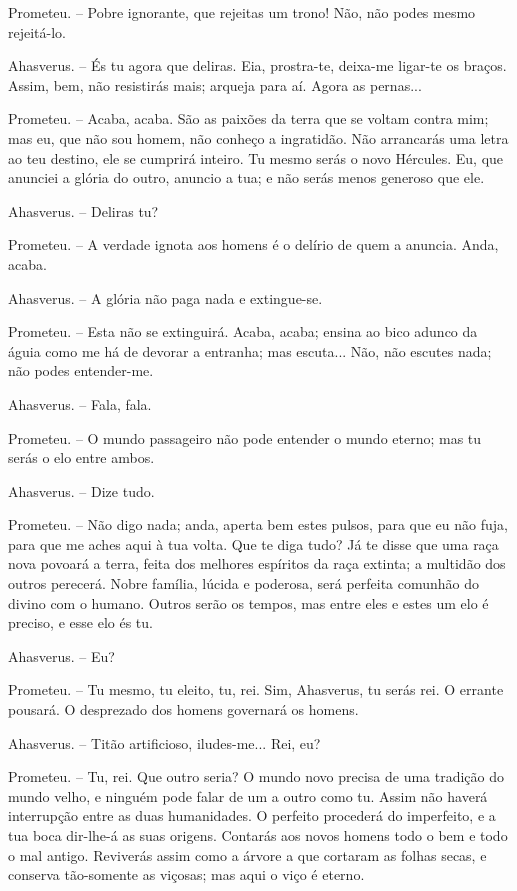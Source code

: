 Prometeu. -- Pobre ignorante, que rejeitas um trono! Não, não podes
mesmo rejeitá-lo.

Ahasverus. -- És tu agora que deliras. Eia, prostra-te, deixa-me
ligar-te os braços. Assim, bem, não resistirás mais; arqueja para aí.
Agora as pernas...

Prometeu. -- Acaba, acaba. São as paixões da terra que se voltam contra
mim; mas eu, que não sou homem, não conheço a ingratidão. Não arrancarás
uma letra ao teu destino, ele se cumprirá inteiro. Tu mesmo serás o novo
Hércules. Eu, que anunciei a glória do outro, anuncio a tua; e não serás
menos generoso que ele.

Ahasverus. -- Deliras tu?

Prometeu. -- A verdade ignota aos homens é o delírio de quem a anuncia.
Anda, acaba.

Ahasverus. -- A glória não paga nada e extingue-se.

Prometeu. -- Esta não se extinguirá. Acaba, acaba; ensina ao bico adunco
da águia como me há de devorar a entranha; mas escuta... Não, não
escutes nada; não podes entender-me.

Ahasverus. -- Fala, fala.

Prometeu. -- O mundo passageiro não pode entender o mundo eterno; mas tu
serás o elo entre ambos.

Ahasverus. -- Dize tudo.

Prometeu. -- Não digo nada; anda, aperta bem estes pulsos, para que eu
não fuja, para que me aches aqui à tua volta. Que te diga tudo? Já te
disse que uma raça nova povoará a terra, feita dos melhores espíritos da
raça extinta; a multidão dos outros perecerá. Nobre família, lúcida e
poderosa, será perfeita comunhão do divino com o humano. Outros serão os
tempos, mas entre eles e estes um elo é preciso, e esse elo és tu.

Ahasverus. -- Eu?

Prometeu. -- Tu mesmo, tu eleito, tu, rei. Sim, Ahasverus, tu serás rei.
O errante pousará. O desprezado dos homens governará os homens.

Ahasverus. -- Titão artificioso, iludes-me... Rei, eu?

Prometeu. -- Tu, rei. Que outro seria? O mundo novo precisa de uma
tradição do mundo velho, e ninguém pode falar de um a outro como tu.
Assim não haverá interrupção entre as duas humanidades. O perfeito
procederá do imperfeito, e a tua boca dir-lhe-á as suas origens.
Contarás aos novos homens todo o bem e todo o mal antigo. Reviverás
assim como a árvore a que cortaram as folhas secas, e conserva
tão-somente as viçosas; mas aqui o viço é eterno.

